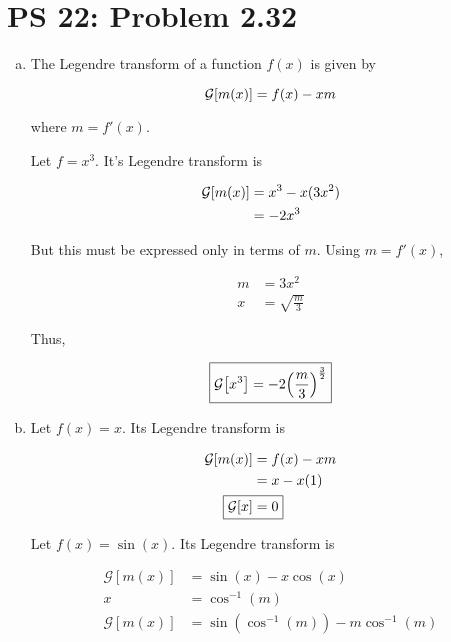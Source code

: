 \documentclass[12pt,a4paper]{article}
\begin{document}
\setcounter{page}{1}

\section*{PS 22: Problem 2.32}
\bigskip

\begin{enumerate}[(a)]

\item The Legendre transform of a function $f(x)$ is given by

\begin{equation}\label{eq:legendre-def}
	\mathcal{G}\qty[m(x)] = f(x) - xm
\end{equation}

where $m = f'(x)$.

Let $f = x^3$. It's Legendre transform is

\begin{align}
	\mathcal{G}\qty[m(x)] &= x^3 - x(3x^2) \nonumber \\
	&= -2x^3
\end{align}

But this must be expressed only in terms of $m$. Using $m = f'(x)$,

\begin{align}
	m &= 3x^2 \nonumber \\
	x &= \sqrt{\frac{m}{3}}
\end{align}

Thus,

\begin{equation}\label{eq:answer-a}
	\boxed{
		\mathcal{G}\qty[x^3] = -2\qty(\frac{m}{3})^{\frac{3}{2}}
	}
\end{equation}

\item Let $f(x) = x$. Its Legendre transform is

\begin{align}
	\mathcal{G}\qty[m(x)] &= f(x) - xm \nonumber \\
	&= x - x(1) \nonumber \\
	\Aboxed{	
		\mathcal{G}\qty[x] &= 0 \label{eq:answer-b1}
	}
\end{align}

Let $f(x) = \sin(x)$. Its Legendre transform is

\begin{align}
	\mathcal{G}[m(x)] &= \sin(x) - x\cos(x) \nonumber \\
	x &= \cos^{-1}(m) \nonumber \\
	\mathcal{G}[m(x)] &= \sin(\cos^{-1}(m)) - m\cos^{-1}(m) \label{eq:sincos}
\end{align}


\end{enumerate}
\end{document}
